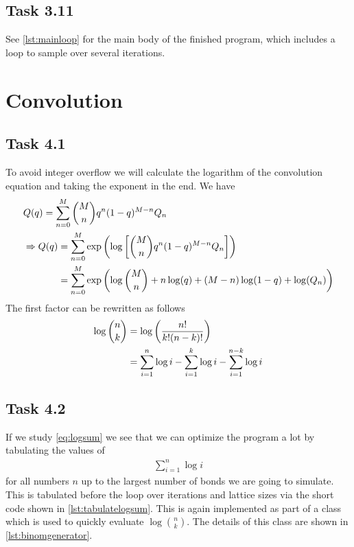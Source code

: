 \documentclass[a4paper]{article}
\begin{document}
\subsection*{Task 3.11}
See \cref{lst:mainloop} for the main body of the finished program, which includes a loop to sample over several iterations.

\section{Convolution}
\subsection*{Task 4.1}
To avoid integer overflow we will calculate the logarithm of the convolution equation and taking the exponent in the end. We have
\begin{align}
    &Q(q) = \sum_{n=0}^M \binom{M}{n} q^n(1-q)^{M-n}Q_n \label{eq:convolution}\\
    &\Rightarrow Q(q) = \sum_{n=0}^M \exp\del{\log\sbr{\binom{M}{n} q^n(1-q)^{M-n}Q_n}} \nonumber\\
    &\hphantom{{}\Rightarrow Q(q){}} = \sum_{n=0}^M \exp\del{\log \binom{M}{n} + n\log(q) + (M-n)\log(1-q) + \log(Q_n) } \nonumber
\end{align}
The first factor can be rewritten as follows
\begin{align}
    \log\binom{n}{k} &= \log\del{\frac{n!}{k!(n-k)!}} \nonumber\\
    &= \sum_{i=1}^n \log i - \sum_{i=1}^k \log i - \sum_{i=1}^{n-k} \log i \label{eq:logsum}
\end{align}

\subsection*{Task 4.2}
If we study \cref{eq:logsum} we see that we can optimize the program a lot by tabulating the values of
\begin{align}
    \sum_{i=1}^{n} \log i
\end{align}
for all numbers $n$ up to the largest number of bonds we are going to simulate. This is tabulated before the loop over iterations and lattice sizes via the short code shown in \cref{lst:tabulatelogsum}. This is again implemented as part of a class  which is used to quickly evaluate $\log\binom{n}{k}$. The details of this class are shown in \cref{lst:binomgenerator}.
\begin{listing}[h!]
%
\caption{%
    A function for tabulating $\sum_{i=1}^{n} \log i$ for all numbers up to . This is defined as a static member function of  and the result stored in a const member variable, as shown in \cref{lst:binomgenerator}.%
    \label{lst:tabulatelogsum}%
}
\end{listing}
\end{document}
